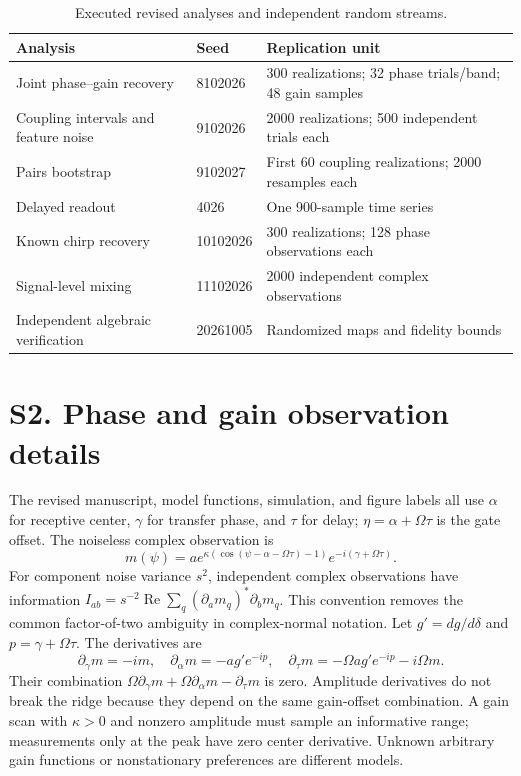 \documentclass[11pt,a4paper]{article}
\begin{document}
\begin{table}[htbp]\centering\small
\caption{Executed revised analyses and independent random streams.}
\begin{tabular}{@{}p{.32\linewidth}p{.2\linewidth}p{.38\linewidth}@{}}\toprule
Analysis & Seed & Replication unit\\\midrule
Joint phase--gain recovery & 8102026 & 300 realizations; 32 phase trials/band; 48 gain samples\\
Coupling intervals and feature noise & 9102026 & 2000 realizations; 500 independent trials each\\
Pairs bootstrap & 9102027 & First 60 coupling realizations; 2000 resamples each\\
Delayed readout & 4026 & One 900-sample time series\\
Known chirp recovery & 10102026 & 300 realizations; 128 phase observations each\\
Signal-level mixing & 11102026 & 2000 independent complex observations\\
Independent algebraic verification & 20261005 & Randomized maps and fidelity bounds\\\bottomrule
\end{tabular}\end{table}

\section*{S2. Phase and gain observation details}
The revised manuscript, model functions, simulation, and figure labels all use $\alpha$ for receptive center, $\gamma$ for transfer phase, and $\tau$ for delay; $\eta=\alpha+\Omega\tau$ is the gate offset. The noiseless complex observation is
\[
 m(\psi)=a e^{\kappa(\cos(\psi-\alpha-\Omega\tau)-1)}e^{-i(\gamma+\Omega\tau)}.
\]
For component noise variance $s^2$, independent complex observations have information $I_{ab}=s^{-2}\operatorname{Re}\sum_q(\partial_a m_q)^*\partial_b m_q$. This convention removes the common factor-of-two ambiguity in complex-normal notation. Let $g'=dg/d\delta$ and $p=\gamma+\Omega\tau$. The derivatives are
\[
 \partial_\gamma m=-im,\quad
 \partial_\alpha m=-a g'e^{-ip},\quad
 \partial_\tau m=-\Omega a g'e^{-ip}-i\Omega m.
\]
Their combination $\Omega\partial_\gamma m+\Omega\partial_\alpha m-\partial_\tau m$ is zero. Amplitude derivatives do not break the ridge because they depend on the same gain-offset combination. A gain scan with $\kappa>0$ and nonzero amplitude must sample an informative range; measurements only at the peak have zero center derivative. Unknown arbitrary gain functions or nonstationary preferences are different models.
\end{document}
